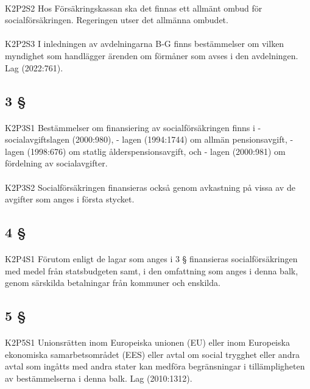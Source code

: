 \documentclass[a4paper,notitlepage,openany,10pt]{book}
\begin{document}
\paragraph*{}
{\tiny K2P2S2}
Hos Försäkringskassan ska det finnas ett allmänt ombud för socialförsäkringen. Regeringen utser det allmänna ombudet.
\paragraph*{}
{\tiny K2P2S3}
I inledningen av avdelningarna B-G finns bestämmelser om vilken myndighet som handlägger ärenden om förmåner som avses i den avdelningen.
Lag (2022:761).
\subsection*{3 §}
\paragraph*{}
{\tiny K2P3S1}
Bestämmelser om finansiering av socialförsäkringen finns i
\newline - socialavgiftslagen (2000:980),
\newline - lagen (1994:1744) om allmän pensionsavgift,
\newline - lagen (1998:676) om statlig ålderspensionsavgift, och
\newline - lagen (2000:981) om fördelning av socialavgifter.
\paragraph*{}
{\tiny K2P3S2}
Socialförsäkringen finansieras också genom avkastning på vissa av de avgifter som anges i första stycket.
\subsection*{4 §}
\paragraph*{}
{\tiny K2P4S1}
Förutom enligt de lagar som anges i 3 § finansieras socialförsäkringen med medel från statsbudgeten samt, i den omfattning som anges i denna balk, genom särskilda betalningar från kommuner och enskilda.
\subsection*{5 §}
\paragraph*{}
{\tiny K2P5S1}
Unionsrätten inom Europeiska unionen (EU) eller inom Europeiska ekonomiska samarbetsområdet (EES) eller avtal om social trygghet eller andra avtal som ingåtts med andra stater kan medföra begränsningar i tillämpligheten av bestämmelserna i denna balk.
Lag (2010:1312).
\end{document}
